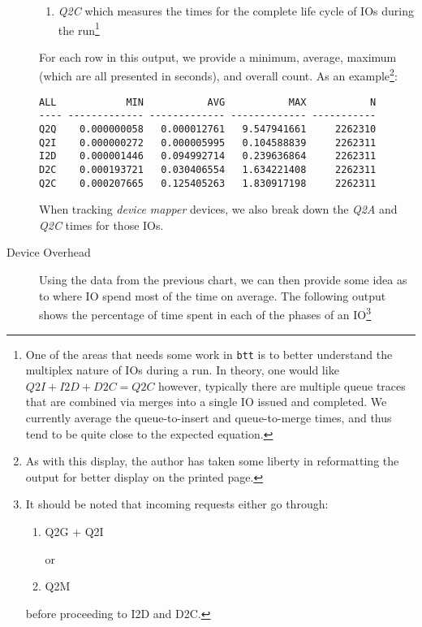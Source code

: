 \documentclass{article}
\begin{document}
\begin{description}
\begin{enumerate}
      \item \emph{Q2C} which measures the times for the complete life cycle
      of IOs during the run\footnote{One of the areas that needs some
      work in \texttt{btt} is to better understand the multiplex nature of
      IOs during a run. In theory, one would like ${Q2I} + {I2D} + {D2C}
      = {Q2C}$ however, typically there are multiple queue traces that
      are combined via merges into a single IO issued and completed. We
      currently average the queue-to-insert and queue-to-merge times,
      and thus tend to be quite close to the expected equation.}

    \end{enumerate}

  For each row in this output, we provide a minimum, average, maximum
  (which are all presented in seconds), and overall count. As an
  example\footnote{As with this display, the author has taken some liberty
  in reformatting the output for better display on the printed page.}:

\begin{verbatim}
ALL            MIN           AVG           MAX           N
---- ------------- ------------- ------------- -----------
Q2Q    0.000000058   0.000012761   9.547941661     2262310
Q2I    0.000000272   0.000005995   0.104588839     2262311
I2D    0.000001446   0.094992714   0.239636864     2262311
D2C    0.000193721   0.030406554   1.634221408     2262311
Q2C    0.000207665   0.125405263   1.830917198     2262311
\end{verbatim}

  When tracking \emph{device mapper} devices, we also break down the
  \emph{Q2A} and \emph{Q2C} times for those IOs.

  \item[Device Overhead]

  Using the data from the previous chart, we can then provide some idea
  as to where IO spend most of the time on average. The following output
  shows the percentage of time spent in each of the phases of an
IO\footnote{It should be noted that incoming requests either go through:

\begin{enumerate}
  \item Q2G + Q2I

  or

  \item Q2M
\end{enumerate}
  before proceeding to I2D and D2C.}


\end{description}
\end{document}

